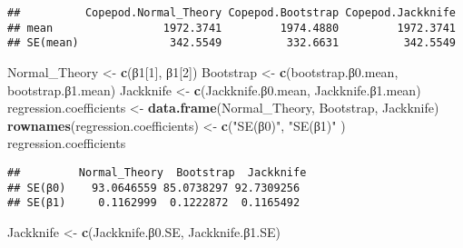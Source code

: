 \documentclass[]{article}
\newenvironment{Shaded}{\begin{snugshade}}{\end{snugshade}}
\newcommand{\KeywordTok}[1]{\textcolor[rgb]{0.13,0.29,0.53}{\textbf{{#1}}}}
\newcommand{\DecValTok}[1]{\textcolor[rgb]{0.00,0.00,0.81}{{#1}}}
\newcommand{\FloatTok}[1]{\textcolor[rgb]{0.00,0.00,0.81}{{#1}}}
\newcommand{\StringTok}[1]{\textcolor[rgb]{0.31,0.60,0.02}{{#1}}}
\newcommand{\NormalTok}[1]{{#1}}
\begin{document}
\begin{verbatim}
##          Copepod.Normal_Theory Copepod.Bootstrap Copepod.Jackknife
## mean                 1972.3741         1974.4880         1972.3741
## SE(mean)              342.5549          332.6631          342.5549
\end{verbatim}

\begin{Shaded}
\begin{Highlighting}[]
\NormalTok{Normal_Theory <-}\StringTok{ }\KeywordTok{c}\NormalTok{(β}\DecValTok{1}\NormalTok{[}\DecValTok{1}\NormalTok{], β}\DecValTok{1}\NormalTok{[}\DecValTok{2}\NormalTok{])}
\NormalTok{Bootstrap <-}\StringTok{ }\KeywordTok{c}\NormalTok{(bootstrap.β}\FloatTok{0.}\NormalTok{mean, bootstrap.β}\FloatTok{1.}\NormalTok{mean)}
\NormalTok{Jackknife <-}\StringTok{ }\KeywordTok{c}\NormalTok{(Jackknife.β}\FloatTok{0.}\NormalTok{mean, Jackknife.β}\FloatTok{1.}\NormalTok{mean)}
\NormalTok{regression.coefficients <-}\StringTok{ }\KeywordTok{data.frame}\NormalTok{(Normal_Theory, Bootstrap, Jackknife)}
\KeywordTok{rownames}\NormalTok{(regression.coefficients) <-}\StringTok{ }\KeywordTok{c}\NormalTok{(}\StringTok{"SE(β0)"}\NormalTok{, }\StringTok{"SE(β1)"} \NormalTok{)}
\NormalTok{regression.coefficients}
\end{Highlighting}
\end{Shaded}

\begin{verbatim}
##         Normal_Theory  Bootstrap  Jackknife
## SE(β0)    93.0646559 85.0738297 92.7309256
## SE(β1)     0.1162999  0.1222872  0.1165492
\end{verbatim}

\begin{Shaded}
\begin{Highlighting}[]
\NormalTok{Jackknife <-}\StringTok{ }\KeywordTok{c}\NormalTok{(Jackknife.β}\FloatTok{0.}\NormalTok{SE, Jackknife.β}\FloatTok{1.}\NormalTok{SE)}
\end{Highlighting}
\end{Shaded}
\end{document}
